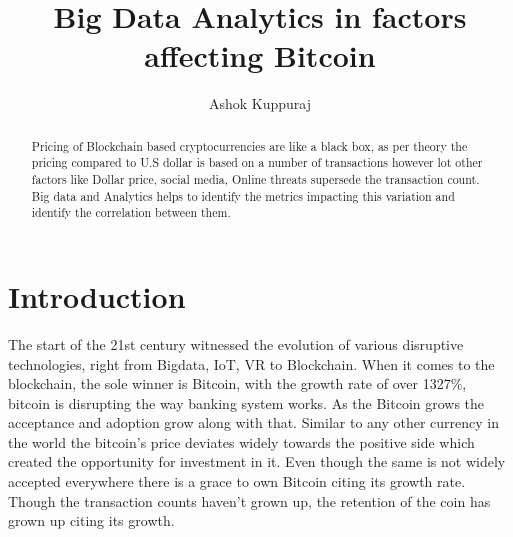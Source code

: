 \documentclass[sigconf]{acmart}
\begin{document}
\title{Big Data Analytics in factors affecting Bitcoin}


\author{Ashok Kuppuraj}


\renewcommand{\shortauthors}{G. v. Laszewski}


\begin{abstract}
Pricing of Blockchain based cryptocurrencies are like a black box, as per theory the pricing compared to U.S dollar is based on a number of transactions however lot other factors like Dollar price, social media, Online threats supersede the transaction count. Big data and Analytics helps to identify the metrics impacting this variation and identify the correlation between them.
\end{abstract}



\maketitle

\section{Introduction}
The start of the 21st century witnessed the evolution of various disruptive technologies, right from Bigdata, IoT, VR to Blockchain. When it comes to the blockchain, the sole winner is Bitcoin, with the growth rate of over 1327\%, bitcoin is disrupting the way banking system works. As the Bitcoin grows the acceptance and adoption grow along with that. Similar to any other currency in the world the bitcoin's price deviates widely towards the positive side which created the opportunity for investment in it. Even though the same is not widely accepted everywhere there is a grace to own Bitcoin citing its growth rate. Though the transaction counts haven't grown up, the retention of the coin has grown up citing its growth.
\end{document}
